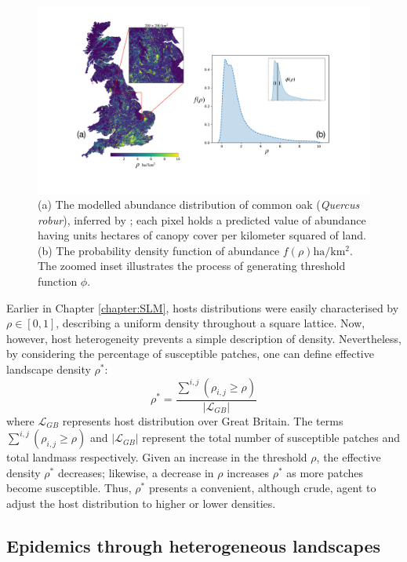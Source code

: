 \newpage

\begin{figure}
    \centering
    \includegraphics[scale=0.32]{chapter4/figures/figure3.pdf}
    \caption{
    (a) The modelled abundance distribution of common oak (\textit{Quercus robur}), inferred by \cite{hill.data}; each pixel holds a predicted value of abundance having units hectares of canopy cover per kilometer squared of land. 
    (b) The probability density function of abundance $f(\rho) \mathrm{ha/km^2}$. 
    The zoomed inset illustrates the process of generating threshold function $\phi$.}
    \label{fig:uk-oak-l.hill}
\end{figure}

Earlier in Chapter \ref{chapter:SLM}, hosts distributions were easily characterised by $\rho \in [0, 1]$, 
describing a uniform density throughout a square lattice.
Now, however, host heterogeneity prevents a simple description of density.
Nevertheless, by considering the percentage of susceptible patches,
one can define effective landscape density $\rho^*$:
\begin{equation}
    \label{eq:rho_eff}
  \rho^{*} = \frac{\sum^{i, j} ( \rho_{i,j} \geq \rho )}{|\mathcal{L}_{GB}|}
\end{equation}
where $\mathcal{L}_{GB}$ represents host distribution over Great Britain. 
The terms $\sum^{i, j} (\rho_{i,j} \geq \rho)$ and $|\mathcal{L}_{GB}|$ represent 
the total number of susceptible patches and total landmass respectively. 
Given an increase in the threshold $\rho$, the effective density $\rho^*$ decreases; 
likewise, a decrease in $\rho$ increases $\rho^*$ as more patches become susceptible. 
Thus, $\rho^{*}$ presents a convenient, although crude, agent
to adjust the host distribution to higher or lower densities.

\subsection{Epidemics through heterogeneous landscapes}

